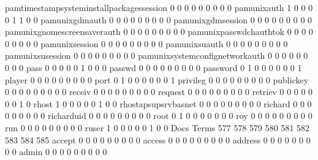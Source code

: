 \documentclass[compress,8pt]{beamer}
\begin{document}
\begin{frame}
\begin{Schunk}
  pamtimestampsysteminstallpackagessession   0   0   0   0   0   0   0   0   0
  pamunixauth                                1   0   0   0   0   1   1   0   0
  pamunixgdmauth                             0   0   0   0   0   0   0   0   0
  pamunixgdmsession                          0   0   0   0   0   0   0   0   0
  pamunixgnomescreensaverauth                0   0   0   0   0   0   0   0   0
  pamunixpasswdchauthtok                     0   0   0   0   0   0   0   0   0
  pamunixsession                             0   0   0   0   0   0   0   0   0
  pamunixsuauth                              0   0   0   0   0   0   0   0   0
  pamunixsusession                           0   0   0   0   0   0   0   0   0
  pamunixsystemconfignetworkauth             0   0   0   0   0   0   0   0   0
  pass                                       0   0   0   0   0   1   0   0   0
  passwd                                     0   0   0   0   0   0   0   0   0
  password                                   0   1   0   0   0   0   0   0   1
  player                                     0   0   0   0   0   0   0   0   0
  port                                       0   1   0   0   0   0   0   0   1
  privileg                                   0   0   0   0   0   0   0   0   0
  publickey                                  0   0   0   0   0   0   0   0   0
  receiv                                     0   0   0   0   0   0   0   0   0
  request                                    0   0   0   0   0   0   0   0   0
  retriev                                    0   0   0   0   0   0   0   1   0
  rhost                                      1   0   0   0   0   0   1   0   0
  rhostapsupsrvbasnet                        0   0   0   0   0   0   0   0   0
  richard                                    0   0   0   0   0   0   0   0   0
  richarduid                                 0   0   0   0   0   0   0   0   0
  root                                       0   1   0   0   0   0   0   0   0
  roy                                        0   0   0   0   0   0   0   0   0
  run                                        0   0   0   0   0   0   0   0   0
  ruser                                      1   0   0   0   0   0   1   0   0
                                          Docs
Terms                                      577 578 579 580 581 582 583 584 585
  accept                                     0   0   0   0   0   0   0   0   0
  access                                     0   0   0   0   0   0   0   0   0
  address                                    0   0   0   0   0   0   0   0   0
  admin                                      0   0   0   0   0   0   0   0   0

\end{Schunk}
\end{frame}
\end{document}
